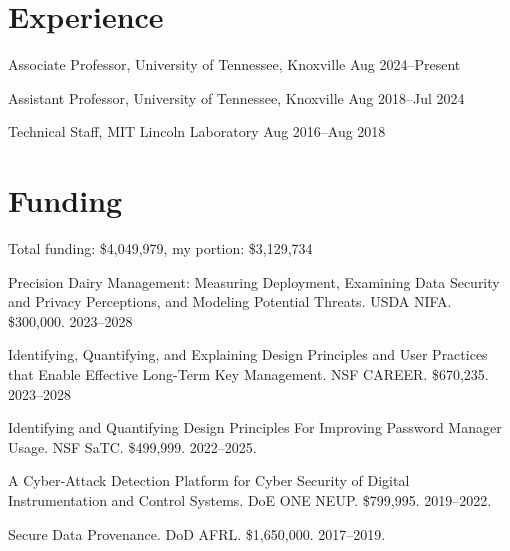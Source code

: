 \documentclass[application,cv]{cv}
\begin{document}
\makeatother

\section{Experience}

\makeatletter

\cv@twoColumnItemRight
	{{\cv@itemTitleStyle Associate Professor}, {\cv@itemSubtitleStyle University of Tennessee, Knoxville}}
	{{\cv@itemExtraInfoStyle Aug 2024--Present}}
\vspace{\itemsep}

\cv@twoColumnItemRight
{{\cv@itemTitleStyle Assistant Professor}, {\cv@itemSubtitleStyle University of Tennessee, Knoxville}}
{{\cv@itemExtraInfoStyle Aug 2018--Jul 2024}}
\vspace{\itemsep}

\cv@twoColumnItemRight
	{{\cv@itemTitleStyle Technical Staff}, {\cv@itemSubtitleStyle MIT Lincoln Laboratory}}
	{{\cv@itemExtraInfoStyle Aug 2016--Aug 2018}}

\makeatother

\section{Funding}
Total funding: \$4,049,979, my portion: \$3,129,734

\begin{description}[labelwidth=3.5em,leftmargin=4em]
	\item[Co-PI] Precision Dairy Management: Measuring Deployment, Examining Data Security and Privacy Perceptions, and Modeling Potential Threats. USDA NIFA. \$300,000. 2023--2028
	
	\item[PI] Identifying, Quantifying, and Explaining Design Principles and User Practices that Enable Effective Long-Term Key Management. NSF CAREER. \$670,235. 2023--2028
	
	\item[PI] Identifying and Quantifying Design Principles For Improving Password Manager Usage. NSF SaTC. \$499,999. 2022--2025.
	
	\item[Co-PI]  A Cyber-Attack Detection Platform for Cyber Security of Digital Instrumentation and Control Systems. DoE ONE NEUP. \$799,995. 2019--2022.
	
	\item[PI] Secure Data Provenance. DoD AFRL. \$1,650,000. 2017--2019.
\end{description}
\end{document}
